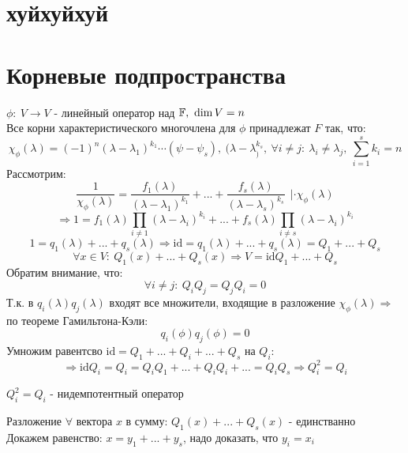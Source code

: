 \section{хуйхуйхуй}
\section{Корневые подпространства}
    $\phi:\ V \to V$ - линейный оператор над $\mathbb F, \ \dim V = n$\\
    Все корни характеристического многочлена для $\phi$ принадлежат $F$ так, что:
    $$\chi_\phi(\lambda) = (-1)^n(\lambda-\lambda_1)^{k_1} \cdots (\psi - \psi_s), \ (\lambda-\lambda_)^{k_s}, \ \forall i \neq j: \  \lambda_i \neq \lambda_j, \ \sum \limits_{i=1}^sk_i = n$$
    Рассмотрим: 
    $$\frac{1}{\chi_\phi(\lambda)} = \frac{f_1(\lambda)}{(\lambda-\lambda_1)^{k_1}} + ... + \frac{f_s(\lambda)}{(\lambda-\lambda_s)^{k_s}} \ \ | \cdot \chi_\phi(\lambda)$$ $$\Longrightarrow 1 = f_1 (\lambda) \prod\limits_{i\neq 1}(\lambda-\lambda_i)^{k_i} + ... + f_s (\lambda) \prod\limits_{i\neq s}(\lambda-\lambda_i)^{k_i}$$
    $$1= q_1(\lambda) + ... + q_s(\lambda) \Longrightarrow  \text{id} = q_1(\lambda) + ... + q_s(\lambda) = Q_1 + ... + Q_s$$
    $$\forall x \in V: \ Q_1(x) + ... + Q_s(x) \Longrightarrow V = \text{id} Q_1 + ... + Q_s$$
    Обратим внимание, что:
    $$\forall i \neq j: \ Q_iQ_j = Q_jQ_i = 0$$
    Т.к. в $q_i(\lambda)q_j(\lambda)$ входят все множители, входящие в разложение $\chi_\phi(\lambda) \Longrightarrow $ по теореме Гамильтона-Кэли: 
    $$q_i(\phi)q_j(\phi) = 0$$
    Умножим равентсво $\text{id} = Q_1+...+Q_i+...+Q_s$ на $Q_i:$ $$\Longrightarrow \text{id}Q_i = Q_i = Q_iQ_1+...+Q_iQ_i+...=Q_iQ_s \Longrightarrow Q_i^2 = Q_i$$
    \begin{definition}
        $Q_i^2 = Q_i$ - нидемпотентный оператор
    \end{definition}  
    Разложение $\forall$ вектора $x$ в сумму: $Q_1(x) + ... + Q_s(x)$ - единстванно\\
    Докажем равенство: $x = y_1+ ... + y_s$, надо доказать, что $y_i = x_i$       